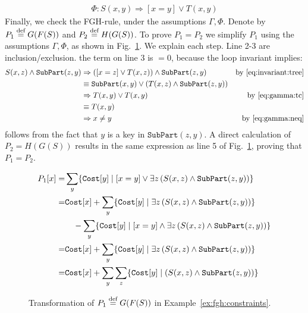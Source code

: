 \begin{ex}
\begin{align}
\Phi: S(x,y) \Rightarrow [x=y] \vee T(x,y) \label{eq:invariant:tree}
  \end{align}
%
%
%
  Finally, we check the FGH-rule, under the assumptions
  $\Gamma, \Phi$.  Denote by $P_1 \stackrel{\text{def}}{=} G(F(S))$ and
  $P_2 \stackrel{\text{def}}{=} H(G(S))$.  To prove $P_1=P_2$ we simplify $P_1$ using
  the assumptions $\Gamma, \Phi$, as shown in
  Fig.~\ref{fig:fgh:constraints}. We explain each step.  Line 2-3 are
  inclusion/exclusion.   the term on
  line 3 is $=0$, because the loop invariant implies:
%
  \begin{align*}
     S(x,z) \wedge \texttt{SubPart}(z,y)& \Rightarrow  ([x=z] \vee T(x,z)) \wedge  \texttt{SubPart}(z,y) & \mbox{by~\eqref{eq:invariant:tree}}\\
&  \equiv \texttt{SubPart}(x,y) \vee (T(x,z) \wedge \texttt{SubPart}(z,y))\\
& \Rightarrow T(x,y) \vee T(x,y) & \mbox{by~\eqref{eq:gamma:tc}}\\
& \equiv  T(x,y) \\
& \Rightarrow  x\neq y & \mbox{by~\eqref{eq:gamma:neq}}
  \end{align*}
%
 follows from the fact that $y$ is a key in
$\texttt{SubPart}(z,y)$.  A direct calculation of $P_2 = H(G(S))$
results in the same expression as line 5 of
Fig.~\ref{fig:fgh:constraints}, proving that $P_1=P_2$.
\end{ex}

\begin{figure}
  \begin{align*}
   P_1[x] = & \sum_y \{{\texttt{Cost}[y]}\mid{[x=y] \vee \exists z\left(S(x,z) \wedge \texttt{SubPart}(z,y)\right)}\}\\
    = & \texttt{Cost}[x]+\sum_y \{{\texttt{Cost}[y]}\mid{\exists z\left(S(x,z) \wedge \texttt{SubPart}(z,y)\right)}\}\\
      & \ \ \ - \sum_y\{{\texttt{Cost}[y]}\mid{[x=y] \wedge \exists z\left(S(x,z) \wedge \texttt{SubPart}(z,y)\right)}\}\\
    = & \texttt{Cost}[x]+\sum_y \{{\texttt{Cost}[y]}\mid{\exists z\left(S(x,z) \wedge \texttt{SubPart}(z,y)\right)}\}\\
    = & \texttt{Cost}[x]+\sum_y \sum_z \{{\texttt{Cost}[y]}\mid{\left(S(x,z) \wedge \texttt{SubPart}(z,y)\right)}\}
  \end{align*}
%
  \caption{Transformation of $P_1 \stackrel{\text{def}}{=} G(F(S))$ in Example~\ref{ex:fgh:constraints}.}
  \label{fig:fgh:constraints}
\end{figure}

